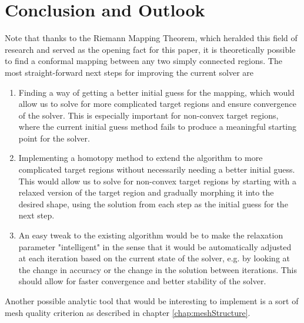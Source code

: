 \section{Conclusion and Outlook}
Note that thanks to the Riemann Mapping Theorem, which heralded this field of research and served as the opening fact for this paper, it is theoretically possible to find a conformal mapping between any two simply connected regions.
The most straight-forward next steps for improving the current solver are
\begin{enumerate}
    \item Finding a way of getting a better initial guess for the mapping, which would allow us to solve for more complicated target regions and ensure convergence of the solver. This is especially important for non-convex target regions, where the current initial guess method fails to produce a meaningful starting point for the solver.
    \item Implementing a homotopy method to extend the algorithm to more complicated target regions without necessarily needing a better initial guess. This would allow us to solve for non-convex target regions by starting with a relaxed version of the target region and gradually morphing it into the desired shape, using the solution from each step as the initial guess for the next step.
    \item An easy tweak to the existing algorithm would be to make the relaxation parameter "intelligent" in the sense that it would be automatically adjusted at each iteration based on the current state of the solver, e.g. by looking at the change in accuracy or the change in the solution between iterations. This should allow for faster convergence and better stability of the solver.
\end{enumerate}

Another possible analytic tool that would be interesting to implement is a sort of mesh quality criterion as described in chapter \ref{chap:meshStructure}. 

